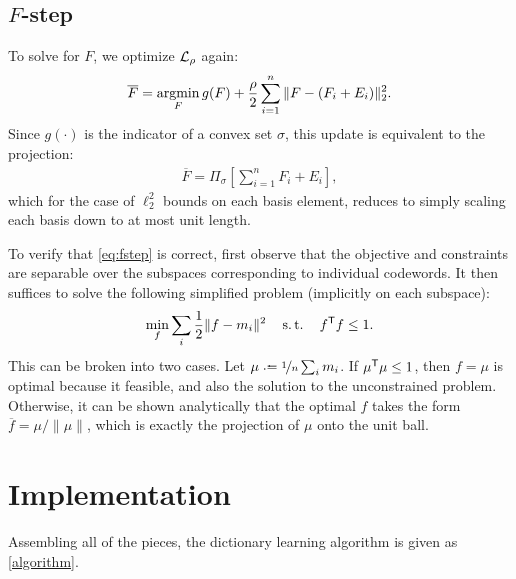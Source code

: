 \documentclass{article}
\begin{document}
\subsection{$F$-step}
To solve for $F$, we optimize $\mathcal{L}_\rho$ again:
\[
\overline{F} = \operatorname*{argmin}_F g(F) + \frac{\rho}{2} \sum_{i=1}^n \|F - (F_i + E_i)\|_2^2.
\]
Since $g(\cdot)$ is the indicator of a convex set $\sigma$, this update is equivalent to the projection:
\begin{align}
\overline{F} = \Pi_\sigma\left[\sum_{i=1}^n F_i + E_i \right], \label{eq:fstep}
\end{align}
which for the case of $\ell_2^2$ bounds on each basis element, reduces to simply scaling each basis down to at most unit length.

To verify that \autoref{eq:fstep} is correct, first observe that the objective and constraints are separable over the subspaces corresponding to individual codewords.  
It then suffices to solve the following simplified problem (implicitly on each subspace):
\[
\min_f \sum_i \frac{1}{2} \|f - m_i\|^2 \quad \operatorname{s.t.} \quad f^\mathsf{T} f \leq 1.
\]
This can be broken into two cases.  Let $\mu \defeq \nicefrac{1}{n}\sum_i m_i$.  If $\mu^\mathsf{T} \mu \leq 1$, then $f = \mu$ is optimal because it feasible, and also the solution to the unconstrained problem.
Otherwise, it can be shown analytically that the optimal $f$ takes the form $\overline{f} = \mu/\|\mu\|$, which is exactly the projection of $\mu$ onto the unit ball.

\section{Implementation}

Assembling all of the pieces, the dictionary learning algorithm is given as \autoref{algorithm}.
\end{document}
